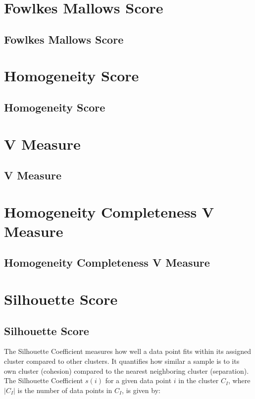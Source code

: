 \section{Fowlkes Mallows Score}
\subsection{Fowlkes Mallows Score}

\clearpage
\thispagestyle{clusteringstyle}
\section{Homogeneity Score}
\subsection{Homogeneity Score}

\clearpage
\thispagestyle{clusteringstyle}
\section{V Measure}
\subsection{V Measure}

\clearpage
\thispagestyle{clusteringstyle}
\section{Homogeneity Completeness V Measure}
\subsection{Homogeneity Completeness V Measure}

\clearpage
\thispagestyle{clusteringstyle}
\section{Silhouette Score}
\subsection{Silhouette Score}

The Silhouette Coefficient measures how well a data point fits within its assigned cluster compared to other clusters. 
It quantifies how similar a sample is to its own cluster (cohesion) compared to the nearest neighboring cluster (separation).
The Silhouette Coefficient $s(i)$ for a given data point $i$ in the cluster $C_I$, where $|C_I|$ is the number of data points in $C_I$, is given by:

